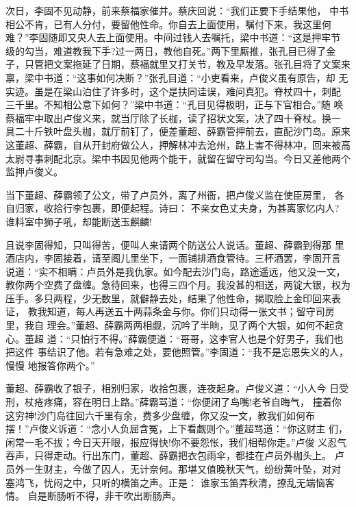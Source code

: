次日，李固不见动静，前来蔡福家催并。蔡庆回说：“我们正要下手结果他，
中书相公不肯，已有人分付，要留他性命。你自去上面使用，嘱付下来，我这里何
难？”李固随即又央人去上面使用。中间过钱人去嘱托，梁中书道：“这是押牢节
级的勾当，难道教我下手?过一两日，教他自死。”两下里厮推，张孔目已得了金
子，只管把文案拖延了日期，蔡福就里又打关节，教及早发落。张孔目将了文案来
禀，梁中书道：“这事如何决断？”张孔目道：“小吏看来，卢俊义虽有原告，却
无实迹。虽是在梁山泊住了许多时，这个是扶同诖误，难问真犯。脊杖四十，刺配
三千里。不知相公意下如何？”梁中书道：“孔目见得极明，正与下官相合。”随
唤蔡福牢中取出卢俊义来，就当厅除了长枷，读了招状文案，决了四十脊杖。换一
具二十斤铁叶盘头枷，就厅前钉了，便差董超、薛霸管押前去，直配沙门岛。原来
这董超、薛霸，自从开封府做公人，押解林冲去沧州，路上害不得林冲，回来被高
太尉寻事刺配北京。梁中书因见他两个能干，就留在留守司勾当。今日又差他两个
监押卢俊义。

当下董超、薛霸领了公文，带了卢员外，离了州衙，把卢俊义监在使臣房里，
各自归家，收拾行李包裹，即便起程。诗曰：
不亲女色丈夫身，为甚离家忆内人?
谁料室中狮子吼，却能断送玉麒麟!

且说李固得知，只叫得苦，便叫人来请两个防送公人说话。董超、薛霸到得那
里酒店内，李固接着，请至阁儿里坐下，一面铺排酒食管待。三杯酒罢，李固开言
说道：“实不相瞒：卢员外是我仇家。如今配去沙门岛，路途遥远，他又没一文，
教你两个空费了盘缠。急待回来，也得三四个月。我没甚的相送，两锭大银，权为
压手。多只两程，少无数里，就僻静去处，结果了他性命，揭取脸上金印回来表证，
教我知道，每人再送五十两蒜条金与你。你们只动得一张文书；留守司房里，我自
理会。”董超、薛霸两两相觑，沉吟了半晌，见了两个大银，如何不起贪心。董超
道：“只怕行不得。”薛霸便道：“哥哥，这李官人也是个好男子，我们也把这件
事结识了他。若有急难之处，要他照管。”李固道：“我不是忘恩失义的人，慢慢
地报答你两个。”

董超、薛霸收了银子，相别归家，收拾包裹，连夜起身。卢俊义道：“小人今
日受刑，杖疮疼痛，容在明日上路。”薛霸骂道：“你便闭了鸟嘴!老爷自晦气，
撞着你这穷神!沙门岛往回六千里有余，费多少盘缠，你又没一文，教我们如何布
摆！”卢俊义诉道：“念小人负屈含冤，上下看觑则个。”董超骂道：“你这财主
们，闲常一毛不拔；今日天开眼，报应得快!你不要怨怅，我们相帮你走。”卢俊
义忍气吞声，只得走动。行出东门，董超、薛霸把衣包雨伞，都挂在卢员外枷头上。
卢员外一生财主，今做了囚人，无计奈何。那堪又值晚秋天气，纷纷黄叶坠，对对
塞鸿飞，忧闷之中，只听的横笛之声。正是：
谁家玉笛弄秋清，撩乱无端恼客情。
自是断肠听不得，非干吹出断肠声。

